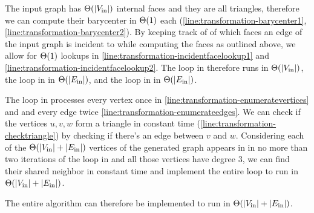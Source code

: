The input graph has $\Theta(\left\lvert V_\text{in}\right\rvert)$ internal faces and they are all triangles, therefore we can compute their barycenter in $\Theta(1)$ each (\cref{line:transformation-barycenter1}, \cref{line:transformation-barycenter2}). By keeping track of of which faces an edge of the input graph is incident to while computing the faces as outlined above, we allow for $\Theta(1)$ lookups in \cref{line:transformation-incidentfacelookup1} and \cref{line:transformation-incidentfacelookup2}. The loop in  therefore runs in $\Theta(\left\lvert V_\text{in}\right\rvert)$, the loop in  in $\Theta(\left\lvert E_\text{in}\right\rvert)$, and the loop in  in $\Theta(\left\lvert E_\text{in}\right\rvert)$.

The loop in  processes every vertex once in \cref{line:transformation-enumeratevertices} and and every edge twice \cref{line:transformation-enumerateedges}. We can check if the vertices $u,v,w$ form a triangle in constant time (\cref{line:transformation-checktriangle}) by checking if there's an edge between $v$ and $w$. Considering each of the $\Theta(\left\lvert V_\text{in}\right\rvert + \left\lvert E_\text{in}\right\rvert)$ vertices of the generated graph appears in  in no more than two iterations of the loop in  and all those vertices have degree 3, we can find their shared neighbor in constant time and implement the entire loop to run in $\Theta(\left\lvert V_\text{in}\right\rvert + \left\lvert E_\text{in}\right\rvert)$.


The entire algorithm can therefore be implemented to run in $\Theta(\left\lvert V_\text{in}\right\rvert + \left\lvert E_\text{in}\right\rvert)$.
